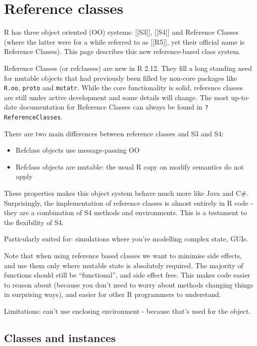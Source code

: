 \hypertarget{reference-classes}{%
\chapter{Reference classes}\label{reference-classes}}

R has three object oriented (OO) systems: {[}{[}S3{]}{]}, {[}{[}S4{]}{]}
and Reference Classes (where the latter were for a while referred to as
{[}{[}R5{]}{]}, yet their official name is Reference Classes). This page
describes this new reference-based class system.

Reference Classes (or refclasses) are new in R 2.12. They fill a long
standing need for mutable objects that had previously been filled by
non-core packages like \texttt{R.oo}, \texttt{proto} and
\texttt{mutatr}. While the core functionality is solid, reference
classes are still under active development and some details will change.
The most up-to-date documentation for Reference Classes can always be
found in \texttt{?ReferenceClasses}.

There are two main differences between reference classes and S3 and S4:

\begin{itemize}
\tightlist
\item
  Refclass objects use message-passing OO
\item
  Refclass objects are mutable: the usual R copy on modify semantics do
  not apply
\end{itemize}

These properties makes this object system behave much more like Java and
C\#. Surprisingly, the implementation of reference classes is almost
entirely in R code - they are a combination of S4 methods and
environments. This is a testament to the flexibility of S4.

Particularly suited for: simulations where you're modelling complex
state, GUIs.

Note that when using reference based classes we want to minimise side
effects, and use them only where mutable state is absolutely required.
The majority of functions should still be ``functional'', and side
effect free. This makes code easier to reason about (because you don't
need to worry about methods changing things in surprising ways), and
easier for other R programmers to understand.

Limitations: can't use enclosing environment - because that's used for
the object.

\hypertarget{classes-and-instances}{%
\section{Classes and instances}\label{classes-and-instances}}

